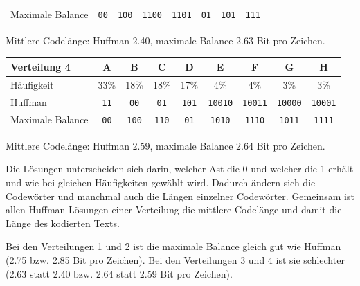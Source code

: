 \begin{myexercise}
\begin{myanswer}
\begin{center}
\begin{tabular}{lccccccc}
				Maximale Balance & \texttt{00} & \texttt{100} & \texttt{1100} & \texttt{1101} & \texttt{01} & \texttt{101} & \texttt{111}
			\end{tabular}
		\end{center}
		Mittlere Codelänge: Huffman 2.40, maximale Balance 2.63 Bit pro Zeichen.
		\begin{center}
			\small
			\begin{tabular}{lcccccccc}
				\textbf{Verteilung 4} & A & B & C & D & E & F & G & H \\\midrule
				Häufigkeit & 33\% & 18\% & 18\% & 17\% & 4\% & 4\% & 3\% & 3\% \\
				Huffman & \texttt{11} & \texttt{00} & \texttt{01} & \texttt{101} & \texttt{10010} & \texttt{10011} & \texttt{10000} & \texttt{10001} \\
				Maximale Balance & \texttt{00} & \texttt{100} & \texttt{110} & \texttt{01} & \texttt{1010} & \texttt{1110} & \texttt{1011} & \texttt{1111}
			\end{tabular}
		\end{center}
		Mittlere Codelänge: Huffman 2.59, maximale Balance 2.64 Bit pro Zeichen.

		Die Lösungen unterscheiden sich darin, welcher Ast die 0 und welcher die 1 erhält und wie bei gleichen Häufigkeiten gewählt wird. Dadurch ändern sich die Codewörter und manchmal auch die Längen einzelner Codewörter. Gemeinsam ist allen Huffman-Lösungen einer Verteilung die mittlere Codelänge und damit die Länge des kodierten Texts.

		Bei den Verteilungen 1 und 2 ist die maximale Balance gleich gut wie Huffman (2.75 bzw. 2.85 Bit pro Zeichen). Bei den Verteilungen 3 und 4 ist sie schlechter (2.63 statt 2.40 bzw. 2.64 statt 2.59 Bit pro Zeichen).
	\end{myanswer}
\end{myexercise}


